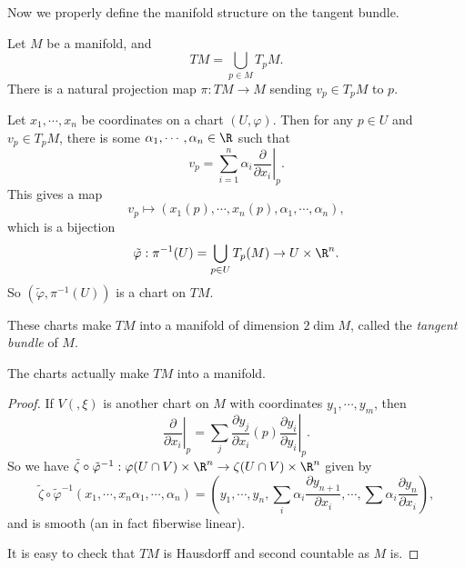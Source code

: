 \documentclass[a4paper]{article}
\begin{document}
Now we properly define the manifold structure on the tangent bundle.

\begin{defi}
  Let $M$ be a manifold, and
  \[
    TM = \bigcup_{p \in M}T_p M.
  \]
  There is a natural projection map $\pi: TM \to M$ sending $v_p \in T_pM$ to $p$.

  Let $x_1, \cdots, x_n$ be coordinates on a chart $(U, \varphi)$. Then for any $p \in U$ and $v_p \in T_p M$, there is some $\alpha_1, \cdots, \alpha_n \in \R$ such that
  \[
    v_p = \sum_{i = 1}^n \alpha_i \left.\frac{\partial}{\partial x_i}\right|_{p}.
  \]
  This gives a map
  \[
    v_p \mapsto (x_1(p), \cdots, x_n(p), \alpha_1, \cdots, \alpha_n),
  \]
  which is a bijection
  \[
    \tilde{\varphi}: \pi^{-1}(U) = \bigcup_{p \in U} T_p(M) \to U \times \R^n.
  \]
  So $(\tilde{\varphi}, \pi^{-1}(U))$ is a chart on $TM$.

  These charts make $TM$ into a manifold of dimension $2 \dim M$, called the \emph{tangent bundle} of $M$.
\end{defi}

\begin{lemma}
  The charts actually make $TM$ into a manifold.
\end{lemma}

\begin{proof}
  If $V(, \xi)$ is another chart on $M$ with coordinates $y_1, \cdots, y_m$, then
  \[
    \left.\frac{\partial}{\partial x_i}\right|_p = \sum_j \frac{\partial y_j}{\partial x_i}(p) \left.\frac{\partial y_i}{\partial y_i}\right|_p.
  \]
  So we have $\tilde{\zeta} \circ \tilde{\varphi}^{-1}: \varphi(U \cap V) \times \R^n \to \zeta(U \cap V) \times \R^n$ given by
  \[
    \tilde{\zeta} \circ \tilde{\varphi}^{-1} (x_1, \cdots, x_n \alpha_1, \cdots, \alpha_n) = \left(y_1, \cdots, y_n, \sum_i \alpha_i \frac{\partial y_{n + 1}}{\partial x_i}, \cdots, \sum \alpha_i \frac{\partial y_n}{\partial x_i}\right),
  \]
  and is smooth (an in fact fiberwise linear).

  It is easy to check that $TM$ is Hausdorff and second countable as $M$ is.
\end{proof}
\end{document}
